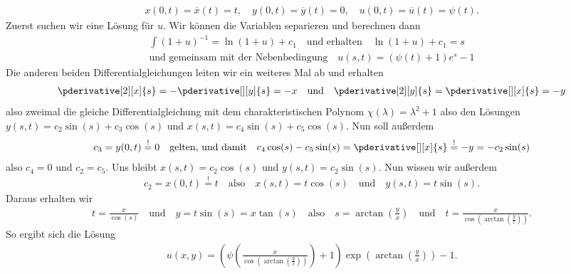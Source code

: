 \begin{solution}
	\begin{align*}
	x(0, t) = \overline{x}(t) = t, \quad
	y(0, t) = \overline{y}(t) = 0, \quad
	u(0, t) = \overline{u}(t) = \psi(t).
	\end{align*}
	Zuerst suchen wir eine Lösung für $u$. Wir können die Variablen separieren und berechnen dann 
	\begin{align*}
	\int (1 + u)^{-1} = \ln(1 + u) + c_1 \quad \text{und erhalten} \quad \ln(1 + u) + c_1 = s \\ \text{und gemeinsam mit der Nebenbedingung} \quad u(s,t) = (\psi(t) + 1) e^s - 1
	\end{align*}
	Die anderen beiden Differentialgleichungen leiten wir ein weiteres Mal ab und erhalten 
	\begin{align*}
	\pderivative[2][x]{s} = - \pderivative[][y]{s} = -x \quad \text{und} \quad \pderivative[2][y]{s} = \pderivative[][x]{s} = -y
	\end{align*}
	also zweimal die gleiche Differentialgleichung mit dem charakteristischen Polynom $\chi(\lambda) = \lambda^2 + 1$ also den Lösungen $y(s,t) = c_2 \sin(s) + c_3 \cos(s)$ und $x(s,t) = c_4 \sin(s) + c_5 \cos(s)$.
	Nun soll außerdem 
	\begin{align*}
	c_3 = y(0,t) \stackrel{!}{=} 0 \quad \text{gelten, und damit} \quad c_4 \cos(s) - c_5 \sin(s) = \pderivative[][x]{s} \stackrel{!}{=} -y = -c_2 \sin(s) 
	\end{align*}
	also $c_4 = 0$ und $c_2 = c_5$. Uns bleibt $x(s,t) = c_2 \cos(s)$ und $y(s,t) = c_2 \sin(s)$. Nun wissen wir außerdem 
	\begin{align*}
	c_2 = x(0,t) \stackrel{!}{=} t \quad \text{also} \quad x(s,t) = t \cos(s) \quad \text{und} \quad y(s,t) = t \sin(s).
	\end{align*}
	Daraus erhalten wir
	\begin{align*}
	t = \frac{x}{\cos(s)} \quad \text{und} \quad y = t \sin(s) = x \tan(s) \quad \text{also} \quad s = \arctan\left(\frac{y}{x}\right) \quad \text{und} \quad t = \frac{x}{\cos\left(\arctan\left(\frac{y}{x}\right)\right)}.
	\end{align*}
	So ergibt sich die Lösung
	\begin{align*}
	u(x,y) = \left(\psi\left(\frac{x}{\cos\left(\arctan\left(\frac{y}{x}\right)\right)}\right) + 1\right) \exp\left(\arctan\left(\frac{y}{x}\right)\right) - 1.
	\end{align*}
\end{solution}

